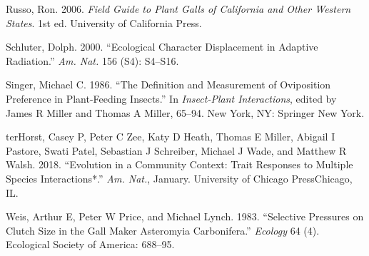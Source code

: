 \documentclass[]{elsarticle} %
\begin{document}
\hypertarget{ref-Russo2006}{}
Russo, Ron. 2006. \emph{Field Guide to Plant Galls of California and
Other Western States}. 1st ed. University of California Press.

\hypertarget{ref-Schluter2000}{}
Schluter, Dolph. 2000. ``Ecological Character Displacement in Adaptive
Radiation.'' \emph{Am. Nat.} 156 (S4): S4--S16.

\hypertarget{ref-Singer1986}{}
Singer, Michael C. 1986. ``The Definition and Measurement of Oviposition
Preference in Plant-Feeding Insects.'' In \emph{Insect-Plant
Interactions}, edited by James R Miller and Thomas A Miller, 65--94. New
York, NY: Springer New York.

\hypertarget{ref-TerHorst2018}{}
terHorst, Casey P, Peter C Zee, Katy D Heath, Thomas E Miller, Abigail I
Pastore, Swati Patel, Sebastian J Schreiber, Michael J Wade, and Matthew
R Walsh. 2018. ``Evolution in a Community Context: Trait Responses to
Multiple Species Interactions*.'' \emph{Am. Nat.}, January. University
of Chicago PressChicago, IL.

\hypertarget{ref-Weis1983}{}
Weis, Arthur E, Peter W Price, and Michael Lynch. 1983. ``Selective
Pressures on Clutch Size in the Gall Maker Asteromyia Carbonifera.''
\emph{Ecology} 64 (4). Ecological Society of America: 688--95.
\end{document}
